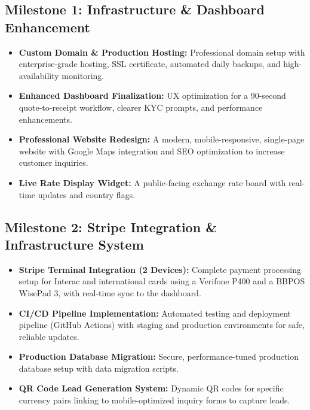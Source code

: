 \documentclass[11pt, a4paper]{article}
\begin{document}
\subsection{Milestone 1: Infrastructure \& Dashboard Enhancement}
\begin{itemize}[leftmargin=*]
    \item \textbf{Custom Domain \& Production Hosting:} Professional domain setup with enterprise-grade hosting, SSL certificate, automated daily backups, and high-availability monitoring.
    \item \textbf{Enhanced Dashboard Finalization:} UX optimization for a 90-second quote-to-receipt workflow, clearer KYC prompts, and performance enhancements.
    \item \textbf{Professional Website Redesign:} A modern, mobile-responsive, single-page website with Google Maps integration and SEO optimization to increase customer inquiries.
    \item \textbf{Live Rate Display Widget:} A public-facing exchange rate board with real-time updates and country flags.
\end{itemize}

\subsection{Milestone 2: Stripe Integration \& Infrastructure System}
\begin{itemize}[leftmargin=*]
    \item \textbf{Stripe Terminal Integration (2 Devices):} Complete payment processing setup for Interac and international cards using a Verifone P400 and a BBPOS WisePad 3, with real-time sync to the dashboard.
    \item \textbf{CI/CD Pipeline Implementation:} Automated testing and deployment pipeline (GitHub Actions) with staging and production environments for safe, reliable updates.
    \item \textbf{Production Database Migration:} Secure, performance-tuned production database setup with data migration scripts.
    \item \textbf{QR Code Lead Generation System:} Dynamic QR codes for specific currency pairs linking to mobile-optimized inquiry forms to capture leads.
\end{itemize}
\end{document}
